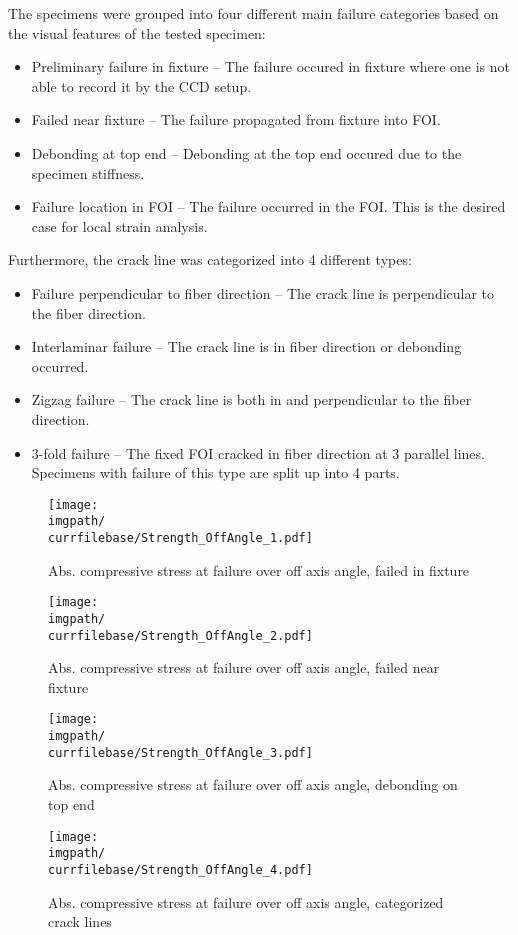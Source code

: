 The specimens were grouped into four different main failure categories based on the visual features of the tested specimen:
\begin{itemize}
    \item[\visfeat{1}] Preliminary failure in fixture -- The failure occured in fixture where one is not able to record it by the CCD setup.
    \item[\visfeat{2}] Failed near fixture -- The failure propagated from fixture into FOI.
    \item[\visfeat{3}] Debonding at top end -- Debonding at the top end occured due to the specimen stiffness.
    \item[\visfeat{4}] Failure location in FOI -- The failure occurred in the FOI. This is the desired case for local strain analysis.
\end{itemize}
Furthermore, the crack line was categorized into 4 different types:
\begin{itemize}
    \item[\visfeat{5}] Failure perpendicular to fiber direction -- The crack line is perpendicular to the fiber direction.
    \item[\visfeat{6}] Interlaminar failure -- The crack line is in fiber direction or debonding occurred.
    \item[\visfeat{7}] Zigzag failure -- The crack line is both in and perpendicular to the fiber direction.
    \item[\visfeat{8}] 3-fold failure -- The fixed FOI cracked in fiber direction at 3 parallel lines. Specimens with failure of this type are split up into 4 parts.
\end{itemize}

\begin{figure}[!ht]
    \centering
    \texttt{[image: \\imgpath/\\currfilebase/Strength\_OffAngle\_1.pdf]}
    \caption{Abs. compressive stress at failure over off axis angle, failed in fixture}
    \label{fig:strength_offAngle_1}
\end{figure}
\begin{figure}[!ht]
    \centering
    \texttt{[image: \\imgpath/\\currfilebase/Strength\_OffAngle\_2.pdf]}
    \caption{Abs. compressive stress at failure over off axis angle, failed near fixture}
    \label{fig:strength_offAngle_2}
\end{figure}
\begin{figure}[!ht]
    \centering
    \texttt{[image: \\imgpath/\\currfilebase/Strength\_OffAngle\_3.pdf]}
    \caption{Abs. compressive stress at failure over off axis angle, debonding on top end}
    \label{fig:strength_offAngle_3}
\end{figure}
\begin{figure}[!ht]
    \centering
    \texttt{[image: \\imgpath/\\currfilebase/Strength\_OffAngle\_4.pdf]}
    \caption{Abs. compressive stress at failure over off axis angle, categorized crack lines}
    \label{fig:strength_offAngle_4}
\end{figure}

